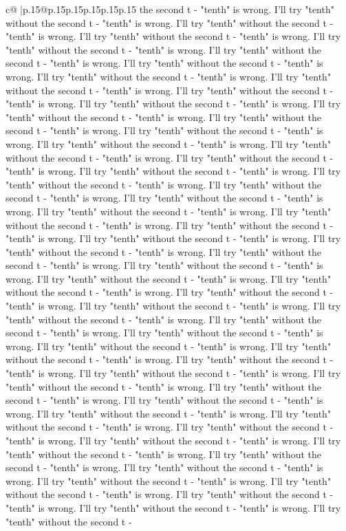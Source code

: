 \documentclass{article}
\begin{document}
{\begin{supertabular}{c@{$\;$}|p{.15\linewidth}@{}p{.15\linewidth}p{.15\linewidth}p{.15\linewidth}p{.15\linewidth}p{.15\linewidth}}
{{{the second t {-} "tenth" is wrong. I'll try "tenth" without the second t {-} "tenth" is wrong. I'll try "tenth" without the second t {-} "tenth" is wrong. I'll try "tenth" without the second t {-} "tenth" is wrong. I'll try "tenth" without the second t {-} "tenth" is wrong. I'll try "tenth" without the second t {-} "tenth" is wrong. I'll try "tenth" without the second t {-} "tenth" is wrong. I'll try "tenth" without the second t {-} "tenth" is wrong. I'll try "tenth" without the second t {-} "tenth" is wrong. I'll try "tenth" without the second t {-} "tenth" is wrong. I'll try "tenth" without the second t {-} "tenth" is wrong. I'll try "tenth" without the second t {-} "tenth" is wrong. I'll try "tenth" without the second t {-} "tenth" is wrong. I'll try "tenth" without the second t {-} "tenth" is wrong. I'll try "tenth" without the second t {-} "tenth" is wrong. I'll try "tenth" without the second t {-} "tenth" is wrong. I'll try "tenth" without the second t {-} "tenth" is wrong. I'll try "tenth" without the second t {-} "tenth" is wrong. I'll try "tenth" without the second t {-} "tenth" is wrong. I'll try "tenth" without the second t {-} "tenth" is wrong. I'll try "tenth" without the second t {-} "tenth" is wrong. I'll try "tenth" without the second t {-} "tenth" is wrong. I'll try "tenth" without the second t {-} "tenth" is wrong. I'll try "tenth" without the second t {-} "tenth" is wrong. I'll try "tenth" without the second t {-} "tenth" is wrong. I'll try "tenth" without the second t {-} "tenth" is wrong. I'll try "tenth" without the second t {-} "tenth" is wrong. I'll try "tenth" without the second t {-} "tenth" is wrong. I'll try "tenth" without the second t {-} "tenth" is wrong. I'll try "tenth" without the second t {-} "tenth" is wrong. I'll try "tenth" without the second t {-} "tenth" is wrong. I'll try "tenth" without the second t {-} "tenth" is wrong. I'll try "tenth" without the second t {-} "tenth" is wrong. I'll try "tenth" without the second t {-} "tenth" is wrong. I'll try "tenth" without the second t {-} "tenth" is wrong. I'll try "tenth" without the second t {-} "tenth" is wrong. I'll try "tenth" without the second t {-} "tenth" is wrong. I'll try "tenth" without the second t {-} "tenth" is wrong. I'll try "tenth" without the second t {-} "tenth" is wrong. I'll try "tenth" without the second t {-} "tenth" is wrong. I'll try "tenth" without the second t {-} "tenth" is wrong. I'll try "tenth" without the second t {-} "tenth" is wrong. I'll try "tenth" without the second t {-} "tenth" is wrong. I'll try "tenth" without the second t {-} "tenth" is wrong. I'll try "tenth" without the second t {-} "tenth" is wrong. I'll try "tenth" without the second t {-} "tenth" is wrong. I'll try "tenth" without the second t {-} "tenth" is wrong. I'll try "tenth" without the second t {-} "tenth" is wrong. I'll try "tenth" without the second t {-} "tenth" is wrong. I'll try "tenth" without the second t {-} "tenth" is wrong. I'll try "tenth" without the second t {-} "tenth" is wrong. I'll try "tenth" without the second t {-} "tenth" is wrong. I'll try "tenth" without the second t {-} "tenth" is wrong. I'll try "tenth" without the second t {-} }}}
\end{supertabular}}
\end{document}
